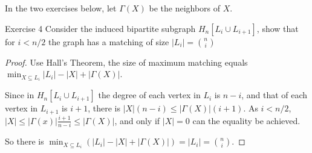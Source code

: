     \newpage

    In the two exercises below, let $\Gamma(X)$ be the neighbors of $X$. 
    \begin{thm}{Exercise 4}{}
        Consider the induced bipartite subgraph $H_n[L_i\cup L_{i+1}]$, show that for $i<n/2$ the graph has a matching of size $|L_i|=\binom{n}{i}$
    \end{thm}
    \begin{proof}
        Use Hall's Theorem, the size of maximum matching equals $\min_{X\subseteq L_i}|L_i|-|X|+|\Gamma(X)|$. 

        Since in $H_n[L_i\cup L_{i+1}]$ the degree of each vertex in $L_i$ is $n-i$, 
        and that of each vertex in $L_{i+1}$ is $i+1$, there is $|X|(n-i)\leq|\Gamma(X)|(i+1)$. 
        As $i<n/2$, $|X|\leq|\Gamma(x)|\frac{i+1}{n-i}\leq|\Gamma(X)|$, and only if $|X|=0$ can the equality be achieved. 

        So there is $\min_{X\subseteq L_i}(|L_i|-|X|+|\Gamma(X)|)=|L_i|=\binom{n}{i}$. 
    \end{proof} 

    \newpage

